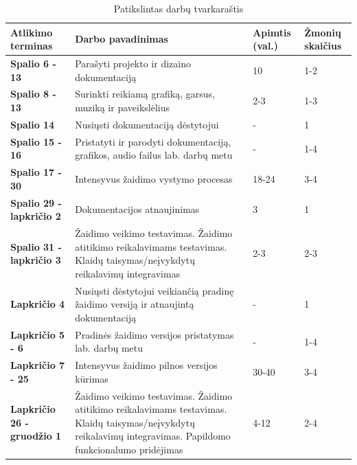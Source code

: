 \documentclass{VUMIFPSkursinis}
\begin{document}
{\centering
\begin{longtable}{|L{3,4cm}|L{8,2cm}|L{1,5cm}|L{1,6cm}|}
\caption{Patikslintas darbų tvarkaraštis}
\label{variability_impl_mech}
\endfirsthead
\endhead
\hline

\textbf{Atlikimo terminas} & 
\textbf{Darbo pavadinimas} & 
\textbf{Apimtis (val.)} & 
\textbf{Žmonių skaičius} \\ \hline

\textbf{Spalio 6 - 13} &
Parašyti projekto ir dizaino dokumentaciją &
10 & 1-2 \\ \hline

\textbf{Spalio 8 - 13} &
Surinkti reikiamą grafiką, garsus, muziką ir paveikslėlius &
2-3 & 1-3 \\ \hline

\textbf{Spalio 14} &
Nusiųsti dokumentaciją dėstytojui &
- & 1 \\ \hline

\textbf{Spalio 15 - 16} &
Pristatyti ir parodyti dokumentaciją, grafikos, audio failus lab. darbų metu &
- & 1-4 \\ \hline

\textbf{Spalio 17 - 30} &
Intensyvus žaidimo vystymo procesas &
18-24 & 3-4 \\ \hline

\textbf{Spalio 29 - lapkričio 2} &
Dokumentacijos atnaujinimas &
3 & 1 \\ \hline

\textbf{
Spalio 31 - lapkričio 3} &
Žaidimo veikimo testavimas.
Žaidimo atitikimo reikalavimams testavimas.
Klaidų taisymas/neįvykdytų reikalavimų integravimas &
2-3 & 2-3 \\ \hline

\textbf{Lapkričio 4} &
Nusiųsti dėstytojui veikiančią pradinę žaidimo versiją ir atnaujintą dokumentaciją &
- & 1 \\ \hline

\textbf{Lapkričio 5 - 6} &
Pradinės žaidimo versijos pristatymas lab. darbų metu &
- & 1-4 \\ \hline

\textbf{Lapkričio 7 - 25} &
Intensyvus žaidimo pilnos versijos kūrimas &
30-40 & 3-4 \\ \hline

\textbf{Lapkričio 26 - gruodžio 1} &
Žaidimo veikimo testavimas.
Žaidimo atitikimo reikalavimams testavimas.
Klaidų taisymas/neįvykdytų reikalavimų integravimas.
Papildomo funkcionalumo pridėjimas &
4-12 & 2-4 \\ \hline


\end{longtable}}
\end{document}
